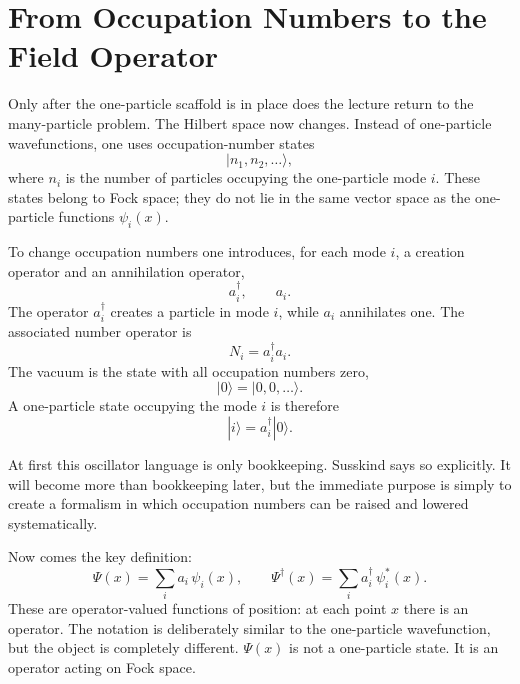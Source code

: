 \section{From Occupation Numbers to the Field Operator}

Only after the one-particle scaffold is in place does the lecture return to the many-particle problem. The Hilbert space now changes. Instead of one-particle wavefunctions, one uses occupation-number states
\begin{equation}
|n_1,n_2,\ldots\rangle,
\end{equation}
where $n_i$ is the number of particles occupying the one-particle mode $i$. These states belong to Fock space; they do not lie in the same vector space as the one-particle functions $\psi_i(x)$.

To change occupation numbers one introduces, for each mode $i$, a creation operator and an annihilation operator,
\begin{equation}
a_i^\dagger,\qquad a_i.
\end{equation}
The operator $a_i^\dagger$ creates a particle in mode $i$, while $a_i$ annihilates one. The associated number operator is
\begin{equation}
N_i=a_i^\dagger a_i.
\end{equation}
The vacuum is the state with all occupation numbers zero,
\begin{equation}
|0\rangle = |0,0,\ldots\rangle.
\end{equation}
A one-particle state occupying the mode $i$ is therefore
\begin{equation}
|i\rangle=a_i^\dagger|0\rangle.
\end{equation}

At first this oscillator language is only bookkeeping. Susskind says so explicitly. It will become more than bookkeeping later, but the immediate purpose is simply to create a formalism in which occupation numbers can be raised and lowered systematically.

Now comes the key definition:
\begin{equation}
\Psi(x)=\sum_i a_i\,\psi_i(x),
\qquad
\Psi^\dagger(x)=\sum_i a_i^\dagger\,\psi_i^*(x).
\end{equation}
These are operator-valued functions of position: at each point $x$ there is an operator. The notation is deliberately similar to the one-particle wavefunction, but the object is completely different. $\Psi(x)$ is not a one-particle state. It is an operator acting on Fock space.

